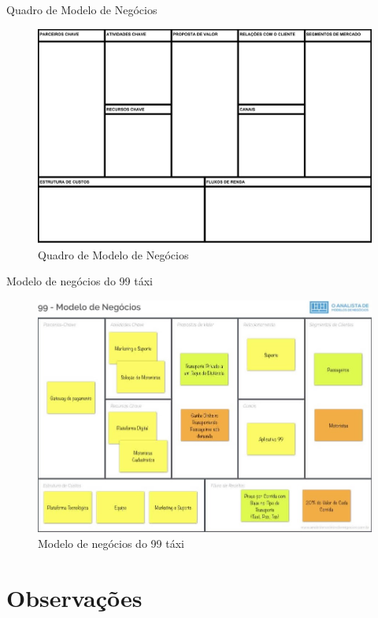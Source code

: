 \documentclass[t]{beamer}
\begin{document}
\begin{frame}{Quadro de Modelo de Negócios}
	\begin{figure}
		\centering
		\includegraphics[width=\linewidth]{bmc-pt}
		\caption{Quadro de Modelo de Negócios}
		\label{fig:bmc}
	\end{figure}
\end{frame}

\begin{frame}{Modelo de negócios do 99 táxi}
	\begin{figure}
		\centering
		\includegraphics[width=0.9\linewidth]{bmc-99}
		\caption{Modelo de negócios do 99 táxi}
		\label{fig:bmc-99}
	\end{figure}
	
\end{frame}

\section{Observações}
\end{document}
